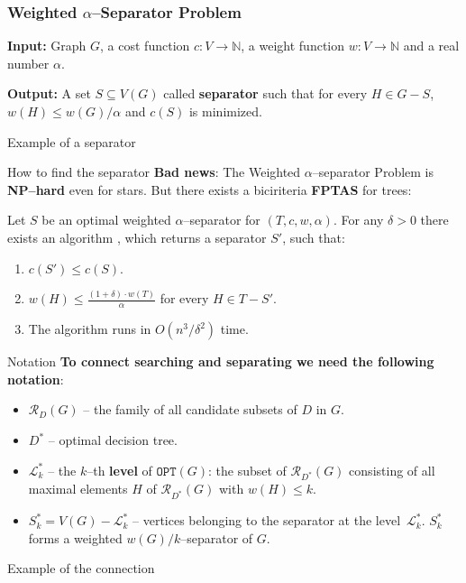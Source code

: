 \documentclass{beamer}
\newcommand{\br}[1]{\mathopen{}\left( #1 \right)}
\newcommand{\OPT}{\texttt{OPT}}
\begin{document}
\begin{frame}
\frametitle{Weighted $\alpha$–Separator Problem}
\begin{tcolorbox}[colback=white, title=Weighted $\alpha$–Separator Problem, fonttitle=\bfseries, breakable]
\textbf{Input:} Graph $G$, a cost function $c\colon V\to \mathbb{N}$, a weight function $w\colon V\to \mathbb{N}$ and a real number $\alpha$.

\textbf{Output:} A set $S\subseteq V\br{G}$ called \textbf{separator} such that for every $H\in G-S$, $w\br{H}\leq w\br{G}/\alpha$ and $c\br{S}$ is minimized.
\end{tcolorbox}

\end{frame}

\begin{frame}{Example of a separator}
    
\end{frame}

\begin{frame}{How to find the separator}
\textbf{Bad news}: The Weighted $\alpha$–separator Problem is \textbf{NP–hard} even for stars.
But there exists a biciriteria \textbf{FPTAS} for trees:
\begin{theorem}
    Let $S$ be an optimal weighted $\alpha$–separator for $\br{T,c,w,\alpha}$. For any $\delta>0$ there exists an algorithm \FSeparatorFPTAS, which returns a separator $S'$, such that:
    \begin{enumerate}
        \item $c\br{S'}\leq c\br{S}$.
        \item $w\br{H}\leq \frac{\br{1+\delta}\cdot w\br{T}}{\alpha}$ for every $H\in T-S'$.
        \item The algorithm runs in $O\br{n^3/\delta^2}$ time.
    \end{enumerate}
\end{theorem}

\end{frame}
\begin{frame}{Notation}
    \textbf{To connect searching and separating we need the following notation}:
    \begin{itemize}
        \item $\mathcal{R}_D\br{G}$ – 
the family of all candidate subsets of $D$ in $G$.
        \item $D^*$ – optimal decision tree.
        \item $\mathcal{L}_{k}^*$ – the $k$–th \textbf{level} of $\OPT\br{G}$: the subset of $\mathcal{R}_{D^*}\br{G}$
        consisting of all maximal elements $H$ of $\mathcal{R}_{D^*}\br{G}$ with $w\br{H} \leq k$.  
        \item $S_{k}^* = V\br{G} - \mathcal{L}_{k}^*$ – vertices belonging to the separator at the level~$\mathcal{L}_{k}^*$. $S_{k}^*$ forms a weighted $w\br{G}/k$–separator of $G$.
    \end{itemize}

\end{frame}
\begin{frame}{Example of the connection}

\end{frame}
\end{document}
